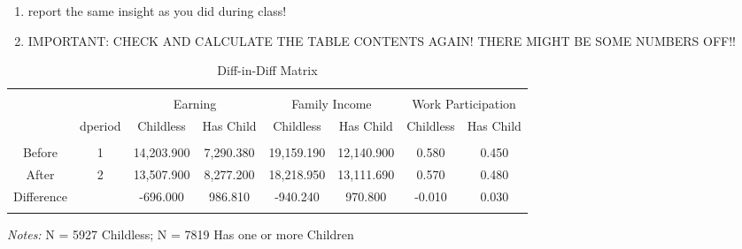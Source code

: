 \documentclass[a4paper]{article}
\begin{document}
\begin{enumerate}
   \item report the same insight as you did during class! 
   \item IMPORTANT: CHECK AND CALCULATE THE TABLE CONTENTS AGAIN! THERE MIGHT BE SOME NUMBERS OFF!!
\end{enumerate}

\begin{table}[!htbp] 
\begin{adjustwidth}{-0cm}{-0cm}
\begin{threeparttable}
\small
\captionsetup{font=small, justification=raggedright,singlelinecheck=false}
  \caption{Diff-in-Diff Matrix} 
  \label{} 
\begin{tabular}{@{\extracolsep{8pt}}lccccccc} 
\\[-5.8ex]\hline 
\hline \\[-1.8ex]
\multicolumn{2}{c}{}  & \multicolumn{2}{c}{Earning}  & \multicolumn{2}{c}{Family Income} & \multicolumn{2}{c}{Work Participation} \\ 
\multicolumn{1}{c}{} & \multicolumn{1}{c}{dperiod} & \multicolumn{1}{c}{Childless} & \multicolumn{1}{c}{Has Child} & \multicolumn{1}{c}{Childless} & \multicolumn{1}{c}{Has Child} & \multicolumn{1}{c}{Childless} & \multicolumn{1}{c}{Has Child} \\ 
\hline \\[-1.8ex] 
\multicolumn{1}{c}{Before} & 1 & 14,203.900 & 7,290.380 & 19,159.190 & 12,140.900 & 0.580 & 0.450 \\ 
\multicolumn{1}{c}{After} & 2 & 13,507.900 & 8,277.200 & 18,218.950 & 13,111.690 & 0.570 & 0.480 \\ 
\multicolumn{1}{c}{Difference} &  & -696.000 & 986.810 & -940.240 & 970.800 & -0.010 & 0.030 \\ 
\hline \\[-3.6ex] 
\end{tabular} 
\begin{tablenotes}
      \small
      \item\textit{Notes:} N = 5927 Childless; N = 7819 Has one or more Children
    \end{tablenotes}
\end{threeparttable}
\end{adjustwidth}
\end{table}
\end{document}
